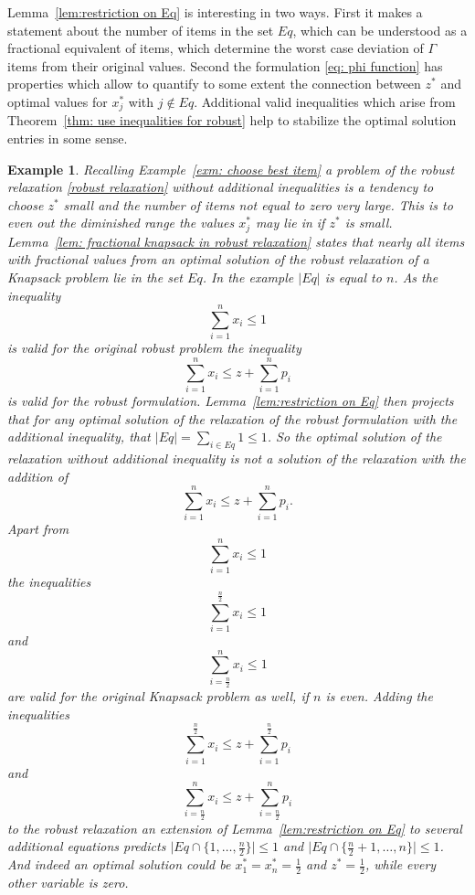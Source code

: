 \documentclass[titlepage, a4paper]{amsbook}
\theoremstyle{plain}
\theoremstyle{break}
\newtheorem{exm}[thm]{Example}
\theoremstyle{definition}
\theoremstyle{remark}
\numberwithin{equation}{thm}
\begin{document}
Lemma~\ref{lem:restriction on Eq} is interesting in two ways. First it makes a statement about the number of items in the set $Eq$, which can be understood as a fractional equivalent of items, which determine the worst case deviation of $\Gamma$ items from their original values. Second the formulation \eqref{eq: phi function} has properties which allow to quantify to some extent the connection between $z^*$ and optimal values for $x^*_j$ with $j \notin Eq$.
Additional valid inequalities which arise from Theorem~\ref{thm: use inequalities for robust} help to stabilize the optimal solution entries in some sense. 
\begin{exm}\label{exm: advtg of knapsack ineq over clique}
Recalling Example~\ref{exm: choose best item} a problem of the robust relaxation \eqref{robust relaxation} without additional inequalities is a tendency to choose $z^*$ small and the number of items not equal to zero very large. This is to even out the diminished range the values $x^*_j$ may lie in if $z^*$ is small. 
Lemma~\ref{lem: fractional knapsack in robust relaxation} states that nearly all items with fractional values from an optimal solution of the robust relaxation of a Knapsack problem lie in the set $Eq$. In the example $\vert Eq \vert$ is equal to $n$. As the inequality 
\[\sum_{i=1}^n x_i \leq 1\]
is valid for the original robust problem 
the inequality 
\[\sum_{i=1}^n x_i \leq z + \sum_{i=1}^n p_i\]
is valid for the robust formulation. 
Lemma~\ref{lem:restriction on Eq} then projects that for any optimal solution of the relaxation of the robust formulation with the additional inequality, that $\vert Eq \vert = \sum_{i \in Eq} 1 \leq 1$. So the optimal solution of the relaxation without additional inequality is not a solution of the relaxation with the addition of 
\[\sum_{i=1}^n x_i \leq z + \sum_{i=1}^n p_i.\]
Apart from 
\[\sum_{i=1}^n x_i \leq 1\]
the inequalities 
\[\sum_{i=1}^{\frac{n}{2}}x_i \leq 1\]
and 
\[\sum_{i=\frac{n}{2}}^{n}x_i \leq 1\]
are valid for the original Knapsack problem as well, if $n$ is even. 
Adding the inequalities
\[\sum_{i=1}^{\frac{n}{2}}x_i \leq z + \sum_{i=1}^{\frac{n}{2}}p_i\]
and 
\[\sum_{i=\frac{n}{2}}^{n}x_i \leq z+ \sum_{i=\frac{n}{2}}^{n}p_i\] to the robust relaxation an extension of Lemma~\ref{lem:restriction on Eq} to several additional equations predicts $\vert Eq \cap \{1, \ldots, \frac{n}{2}\} \vert \leq 1$ and $\vert Eq \cap \{ \frac{n}{2}+1, \ldots, n\} \vert \leq 1$. And indeed an optimal solution could be 
$x^*_1=x^*_n=\frac{1}{2}$ and $z^*=\frac{1}{2}$, while every other variable is zero. 
\end{exm}
\end{document}
